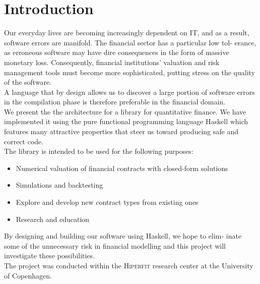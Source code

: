 \chapter{Introduction}

Our everyday lives are becoming increasingly dependent on IT, and as a result,
software errors are manifold. The financial sector has a particular low tol-
erance, as erroneous software may have dire consequences in the form of
massive monetary loss. Consequently, financial institutions' valuation and risk
management tools must become more sophisticated, putting stress on the quality
of the software.\\

A language that by design allows us to discover a large portion of software
errors in the compilation phase is therefore preferable in the financial domain.\\

We present the the architecture for a library for quantitative finance. We have
implemented it using the pure functional programming language Haskell which
features many attractive properties that steer us toward producing safe and
correct code.\\

The library is intended to be used for the following purposes:\\

\begin{itemize}
\item Numerical valuation of financial contracts with closed-form solutions
\item Simulations and backtesting
\item Explore and develop new contract types from existing ones
\item Research and education
\end{itemize}

By designing and building our software using Haskell, we hope to elim-
inate some of the unnecessary risk in financial modelling and this project
will investigate these possibilities.\\

The project was conducted within the \textsc{Hiperfit} research center at the
University of Copenhagen.\cite{Haskell}
